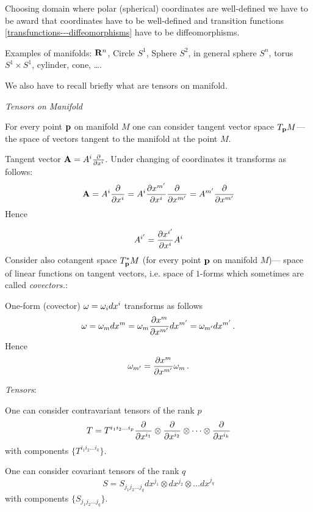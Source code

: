 \documentclass[12pt]{article}
\theoremstyle{theorem}
\numberwithin{equation}{section}
\begin{document}
 Choosing domain where polar (spherical) coordinates are well-defined we have to be award
that coordinates have to be well-defined and transition functions \eqref{transfunctions---diffeomorphisms}
  have to be diffeomorphisms.
\m


Examples of manifolds: ${\bf R}^n$, Circle $S^1$,  Sphere $S^2$, in general sphere $S^n$, torus $S^1\times S^1$,
  cylinder, cone, \dots.

\m

We also have to recall briefly what are tensors on manifold.
\m


        \centerline {\it Tensors on Manifold}

For every point ${\bf p}$ on manifold $M$
one can consider tangent vector space $T_{\bf p} M$---the space of vectors tangent to the manifold at the point $M$.


 Tangent vector ${\bf A}=A^i{\partial\over \partial x^i}$. Under changing of coordinates it transforms as follows:
             $$
         {\bf A}=A^i{\partial\over \partial x^i}=A^i{\partial x^{m'}\over \partial x^i}{\partial\over \partial x^{m'}}=A^{m'}{\partial\over \partial x^{m'}}
             $$
  Hence

            \begin{equation}\label{transformofvector}
                   A^{i'}={\partial x^{i'}\over \partial x^i}A^i
            \end{equation}
              Consider also cotangent space $T^*_{\bf p} M$ (for every point ${\bf p}$ on manifold $M$)---
              space of linear functions on tangent vectors, i.e. space of $1$-forms which sometimes are called
              {\it covectors.}:

         One-form (covector) $\omega=\omega_idx^i$ transforms as follows
            $$
      \omega=\omega_m dx^m=\omega_m {\partial x^m\over \partial x^{m'}}dx^{m'}=\omega_{m'}dx^{m'}\,.
        $$
      Hence
         \begin{equation}\label{transformofoneform}
            \omega_{m'}={\partial x^{m}\over \partial x^{m'}}\omega_m\,.
         \end{equation}

\m

          {\it Tensors}:
\smallskip

One can consider contravariant tensors  of the rank $p$
                   $$
             T=  T^{i_1i_2\dots i_p}{\partial\over \partial x^{i_1}}\otimes
             {\partial\over \partial x^{i_2}}\otimes \dots \otimes {\partial\over \partial x^{i_k}}
                   $$
with components $\{T^{i_1i_2\dots i_k}\}$.


One can consider covariant tensors  of the rank $q$
                   $$
             S=  S_{j_1j_2\dots j_q}dx^{j_1}\otimes
              dx^{j_2}\otimes \dots dx^{j_q}
                   $$
with components $\{S_{j_1j_2\dots j_q}\}$.
\end{document}
